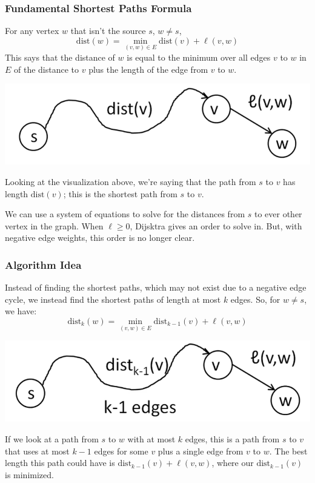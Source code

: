 \documentclass[letterpaper]{article}
\begin{document}
\subsubsection{Fundamental Shortest Paths Formula}
For any vertex $w$ that isn't the source $s$, $w \neq s$,
\[\text{dist}(w) = \min_{(v, w) \in E} \text{dist}(v) + \ell(v, w)\]
This says that the distance of $w$ is equal to the minimum over all edges $v$ to $w$ in $E$ of the distance to $v$ plus the length of the edge from $v$ to $w$. 
\begin{center}
    \includegraphics[scale=0.4]{assets/fun_sho_path.png}
\end{center}
Looking at the visualization above, we're saying that the path from $s$ to $v$ has length $\text{dist}(v)$; this is the shortest path from $s$ to $v$.

\bigskip 

We can use a system of equations to solve for the distances from $s$ to ever other vertex in the graph. When $\ell \geq 0$, Dijsktra gives an order to solve in. But, with negative edge weights, this order is no longer clear. 


\subsubsection{Algorithm Idea}
Instead of finding the shortest paths, which may not exist due to a negative edge cycle, we instead find the shortest paths of length at most $k$ edges. So, for $w \neq s$, we have: 
\[\text{dist}_{k}(w) = \min_{(v, w) \in E} \text{dist}_{k - 1}(v) + \ell(v, w)\]
\begin{center}
    \includegraphics[scale=0.4]{assets/fun_sho_path_2.png}
\end{center}
If we look at a path from $s$ to $w$ with at most $k$ edges, this is a path from $s$ to $v$ that uses at most $k - 1$ edges for some $v$ plus a single edge from $v$ to $w$. The best length this path could have is $\text{dist}_{k - 1}(v) + \ell(v, w)$, where our $\text{dist}_{k - 1}(v)$ is minimized. 
\end{document}

